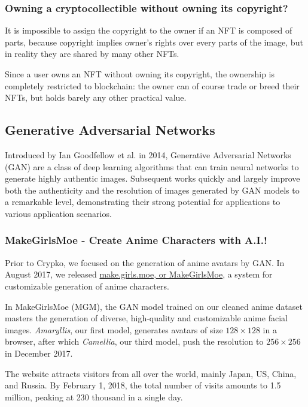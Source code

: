 \documentclass[a4paper]{article}
\begin{document}
\subsubsection{Owning a cryptocollectible without owning its copyright?}

It is impossible to assign the copyright to the owner if an NFT is composed of parts, because copyright implies owner's rights over every parts of the image, but in reality they are shared by many other NFTs.

Since a user owns an NFT without owning its copyright, the ownership is completely restricted to blockchain: the owner can of course trade or breed their NFTs, but holds barely any other practical value.

\subsection{Generative Adversarial Networks}

Introduced by Ian Goodfellow et al. in 2014, Generative Adversarial Networks (GAN)\cite{goodfellow2014generative} are a class of deep learning algorithms that can train neural networks to generate highly authentic images. Subsequent works quickly and largely improve both the authenticity and the resolution of images generated by GAN models to a remarkable level\cite{radford2015unsupervised,karras2017progressive}, 
demonstrating their strong potential for applications to various application scenarios.

\subsubsection{MakeGirlsMoe - Create Anime Characters with A.I.!}

Prior to Crypko, we focused on the generation of anime avatars by GAN. In August 2017, we released \href{http://make.girls.moe/#/}{make.girls.moe, or MakeGirlsMoe}, a system for customizable generation of anime characters.

In MakeGirlsMoe (MGM), the GAN model trained on our cleaned anime dataset masters the generation of diverse, high-quality and customizable anime facial images. \emph{Amaryllis}, our first model, generates avatars of size $128 \times 128$ in a browser, after which \emph{Camellia}, our third model, push the resolution to $256 \times 256$ in December 2017.

The website attracts visitors from all over the world, mainly Japan, US, China, and Russia. By February 1, 2018, the total number of visits amounts to 1.5 million, peaking at 230 thousand in a single day.
\end{document}
